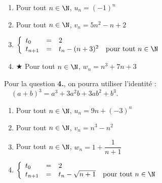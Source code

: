 \documentclass[a4paper,11pt,exos]{nsi} %
\begin{document}
\exo{}
\begin{multicols}{2}
	\begin{enumerate}
		\item 	Pour tout $n\in\N$, $u_n=(-1)^n$
		\item 	Pour tout $n\in\N$, $v_n=5n^2-n+2$\\
		\columnbreak
		
		\item 	$\left\{
		\begin{array}{llll}
			t_0 & = & 2 &\\ 
			t_{n+1} & = & t_n-(n+3)^2&\text{pour tout}\  n\in\N\\
		\end{array}\right. $
		\item 	$\bigstar$ Pour tout $n\in\N$, $w_n=n^3+7n+3$
	\end{enumerate}
\end{multicols}
Pour la question \textbf{4.}, on pourra utiliser l'identité :$\quad (a+b)^3=a^3+3a^2b+3ab^2+b^3$.\\


\newpage

\exo{}
\begin{multicols}{2}
	\begin{enumerate}
		\item 	Pour tout $n\in\N$, $u_n=9n+(-3)^n$
		\item 	Pour tout $n\in\N$, $v_n=n^3-n^2$\\
		\item 	Pour tout $n\in\N$, $w_n=1+\dfrac{1}{n+1}$
		\item 	$\left\{
		\begin{array}{llll}
			t_0 & = & 2 &\\ 
			t_{n+1} & = & t_n-\sqrt{n+1}& \text{pour tout }  n\in\N\\
		\end{array}\right. $
	\end{enumerate}
\end{multicols}
\end{document}
